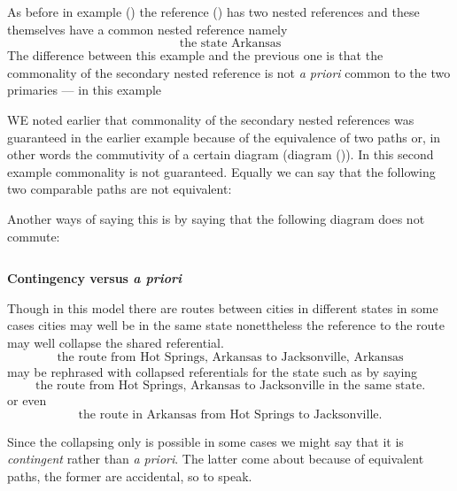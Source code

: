 \mynote 
As before in example () the reference () has two nested references and these themselves have a common nested reference namely
\begin{equation*}
\mbox{the state Arkansas}
\end{equation*}
The difference between this example and the previous one is that the commonality of the secondary nested reference is not  \textit{a priori}
 common to the two primaries --- in this example

\mynote
WE noted earlier that commonality of the secondary nested references was guaranteed in the earlier example because of the equivalence of two paths or, in other words the commutivity of a certain diagram (diagram ()).
In this second example commonality is not guaranteed. Equally we can say that the following two comparable paths are not equivalent:

Another ways of saying this is by saying that the following diagram does not commute:
\iffalse
\begin{equation*}

\end{equation*}
\fi

\begin{equation*}

\end{equation*}

\textbf{Contingency versus \textit{a priori}}

Though in this model there are routes between cities in different states in some cases cities may well be in the same state nonettheless the reference to the route may well collapse the shared referential.
\begin{equation}
\mbox{the route from Hot Springs, Arkansas to Jacksonville, Arkansas}
\end{equation}
may be rephrased with collapsed referentials for the state such as by saying
\begin{equation}
\mbox{the route from Hot Springs, Arkansas to Jacksonville in the same state.}
\end{equation}
or even 
\begin{equation}
\mbox{the route in Arkansas from Hot Springs to Jacksonville.}
\end{equation} 

Since the collapsing only is possible in some cases we might say that it is \textit{contingent} rather than \textit{a priori}. The latter come about because of equivalent paths, the former are accidental, so to speak.


